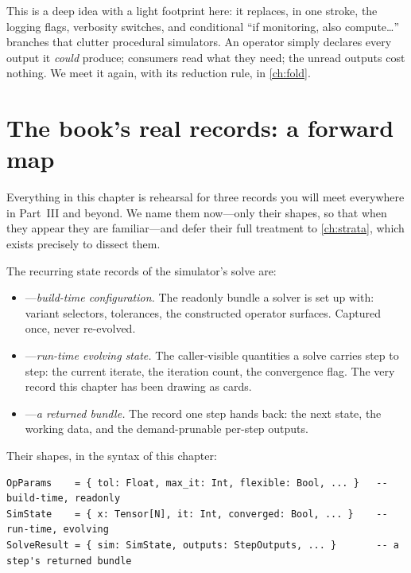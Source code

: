 This is a deep idea with a light footprint here: it replaces, in one stroke, the
logging flags, verbosity switches, and conditional ``if monitoring, also
compute\dots'' branches that clutter procedural simulators. An operator simply
declares every output it \emph{could} produce; consumers read what they need; the
unread outputs cost nothing. We meet it again, with its reduction rule, in
\cref{ch:fold}.

\section{The book's real records: a forward map}

Everything in this chapter is rehearsal for three records you will meet
everywhere in Part~III and beyond. We name them now---only their shapes, so that
when they appear they are familiar---and defer their full treatment to
\cref{ch:strata}, which exists precisely to dissect them.

\begin{definition}
\label{def:workhorse}
The recurring state records of the simulator's solve are:
\begin{itemize}[nosep]
  \item \textbf{}---\emph{build-time configuration.} The readonly
  bundle a solver is set up with: variant selectors, tolerances, the constructed
  operator surfaces. Captured once, never re-evolved.
  \item \textbf{}---\emph{run-time evolving state.} The
  caller-visible quantities a solve carries step to step: the current iterate, the
  iteration count, the convergence flag. The very record this chapter has been
  drawing as cards.
  \item \textbf{}---\emph{a returned bundle.} The record one step
  hands back: the next state, the working data, and the demand-prunable per-step
  outputs.
\end{itemize}
\end{definition}

Their shapes, in the syntax of this chapter:

\begin{lstlisting}[style=l4style]
OpParams    = { tol: Float, max_it: Int, flexible: Bool, ... }   -- build-time, readonly
SimState    = { x: Tensor[N], it: Int, converged: Bool, ... }    -- run-time, evolving
SolveResult = { sim: SimState, outputs: StepOutputs, ... }       -- a step's returned bundle
\end{lstlisting}

